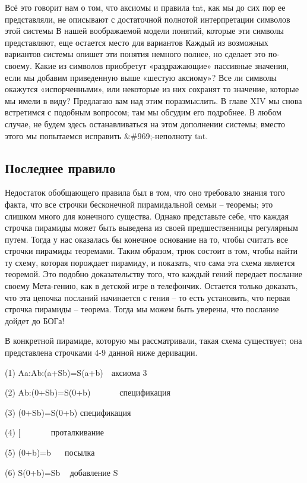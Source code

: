 \documentclass[../main.tex]{subfiles}
\begin{document}
Всё это говорит нам о том, что аксиомы и правила \acs{tnt}, как мы до сих пор ее представляли, не описывают с достаточной полнотой интерпретации символов этой системы В нашей воображаемой модели понятий, которые эти символы представляют, еще остается место для вариантов Каждый из возможных вариантов системы опишет эти понятия немного полнее, но сделает это по-своему. Какие из символов приобретут «раздражающие» пассивные значения, если мы добавим приведенную выше «шестую аксиому»? Все ли символы окажутся «испорченными», или некоторые из них сохранят то значение, которые мы имели в виду? Предлагаю вам над этим поразмыслить. В главе XIV мы снова встретимся с подобным вопросом; там мы обсудим его подробнее. В любом случае, не будем здесь останавливаться на этом дополнении системы; вместо этого мы попытаемся исправить \&\#969;-неполноту \acs{tnt}.


\subsection{Последнее правило}

Недостаток обобщающего правила был в том, что оно требовало знания того факта, что все строчки бесконечной пирамидальной семьи \--- теоремы; это слишком много для конечного существа. Однако представьте себе, что каждая строчка пирамиды может быть выведена из своей предшественницы регулярным путем. Тогда у нас оказалась бы конечное основание на то, чтобы считать все строчки пирамиды теоремами. Таким образом, трюк состоит в том, чтобы найти ту схему, которая порождает пирамиду, и показать, что сама эта схема является теоремой. Это подобно доказательству того, что каждый гений передает послание своему Мета-гению, как в детской игре в телефончик. Остается только доказать, что эта цепочка посланий начинается с гения \--- то есть установить, что первая строчка пирамиды \--- теорема. Тогда мы можем быть уверены, что послание дойдет до БОГа!

В конкретной пирамиде, которую мы рассматривали, такая схема существует; она представлена строчками 4-9 данной ниже деривации.

(1) Aa:Ab:(a+Sb)=S(a+b)~~аксиома 3

(2) Ab:(0+Sb)=S(0+b)~~~~~~~спецификация

(3) (0+Sb)=S(0+b) спецификация

(4) {[} ~~~~~~ проталкивание

(5) (0+b)=b ~~ посылка

(6) S(0+b)=Sb ~ добавление S
\end{document}
